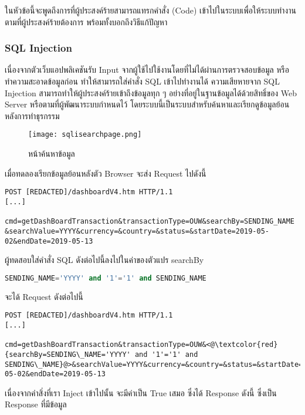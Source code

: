 ในหัวข้อนี้จะพูดถึงการที่ผู้ประสงค์ร้ายสามารถแทรกคำสั่ง (Code) เข้าไปในระบบเพื่อให้ระบบทำงานตามที่ผู้ประสงค์ร้ายต้องการ พร้อมทั้งบอกถึงวิธีแก้ปัญหา

\subsubsection{SQL Injection}

เนื่องจากตัวเว็บแอปพลิเคชันรับ Input จากผู้ใช้ไปใช้งานโดยที่ไม่ได้ผ่านการตรวจสอบข้อมูล หรือทำความสะอาดข้อมูลก่อน ทำให้สามารถใส่คำสั่ง SQL เข้าไปทำงานได้ ความเสียหายจาก SQL Injection สามารถทำให้ผู้ประสงค์ร้ายเข้าถึงข้อมูลทุก ๆ อย่างที่อยู่ในฐานข้อมูลได้ด้วยสิทธิ์ของ Web Server หรือตามที่ผู้พัฒนาระบบกำหนดไว้ โดยระบบนี้เป็นระบบสำหรับค้นหาและเรียกดูข้อมูลย้อนหลังการทำธุรกรรม

\begin{figure}[h]
	\centering
	\texttt{[image: sqlisearchpage.png]}
	\caption{หน้าค้นหาข้อมูล}
	\label{Fig:sqlisearchpage.png}
\end{figure}

เมื่อทดลองเรียกข้อมูลย้อนหลังตัว Browser จะส่ง Request ไปดังนี้

\begin{lstlisting}[numbers=none] 
POST [REDACTED]/dashboardV4.htm HTTP/1.1
[...]

cmd=getDashBoardTransaction&transactionType=OUW&searchBy=SENDING_NAME &searchValue=YYYY&currency=&country=&status=&startDate=2019-05-02&endDate=2019-05-13
\end{lstlisting}

ผู้ทดสอบใส่คำสั่ง SQL ดังต่อไปนี้ลงไปในค่าของตัวแปร searchBy

\begin{lstlisting}[language=sql,numbers=none] 
SENDING_NAME='YYYY' and '1'='1' and SENDING_NAME
\end{lstlisting}

จะได้ Request ดังต่อไปนี้

\begin{lstlisting}[numbers=none] 
POST [REDACTED]/dashboardV4.htm HTTP/1.1
[...]

cmd=getDashBoardTransaction&transactionType=OUW&<@\textcolor{red}{searchBy=SENDING\_NAME='YYYY' and '1'='1' and SENDING\_NAME}@>&searchValue=YYYY&currency=&country=&status=&startDate=2019-05-02&endDate=2019-05-13
\end{lstlisting}

เนื่องจากคำสิ่งที่เรา Inject เข้าไปนั้น จะมีค่าเป็น True เสมอ ซึ่งได้ Response ดังนี้ ซึ่งเป็น Response ที่มีข้อมูล

